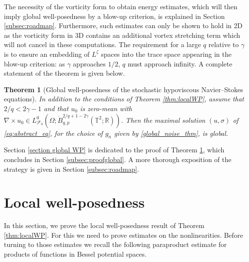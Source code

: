 \documentclass[11pt, a4paper,oneside, reqno]{amsart}
\newtheorem{theorem}{Theorem}
\theoremstyle{remark} %
\theoremstyle{definition} %
\numberwithin{theorem}{section}
\numberwithin{equation}{section}
\def\R{{\mathbb R}}
\newcommand{\Om}{\Omega}
\newcommand{\T}{\mathbb{T}}
\newcommand{\mc}{\mathcal}
\newcommand{\gam}{\gamma}
\begin{document}
The necessity of the vorticity form to obtain energy estimates, which will then imply global well-posedness by a blow-up criterion, is explained in Section \ref{subsec:roadmap}. Furthermore, such estimates can only be shown to hold in 2D as the vorticity form in 3D contains an additional vortex stretching term which will not cancel in these computations. The requirement for a large $q$ relative to $\gamma$ is to ensure an embedding of $L^\zeta$ spaces into the trace space appearing in the blow-up criterion: as $\gamma$ approaches $1/2$, $q$ must approach infinity. A complete statement of the theorem is given below.

\begin{theorem}[Global well-posedness of the stochastic hypoviscous Navier--Stokes equations]\label{thm:globalWPvelocity}
In addition to the conditions of Theorem \ref{thm:localWP}, assume that $2/q< 2\gam-1$ and that $u_0$ is zero-mean with $\nabla \times u_0 \in L^0_{\mc{F}_0}(\Om; \dot{B}_{q,p}^{2/q+1-2\gam}(\T^2;\R))$.
Then the maximal solution $(u,\sigma)$ of \eqref{eq:abstract_eq}, for the choice of $g_n$ given by \eqref{global_noise_thm}, is global.
\end{theorem}

Section \ref{section global WP} is dedicated to the proof of Theorem \ref{thm:globalWPvelocity}, which concludes in Section \ref{subsec:proofglobal}. A more thorough exposition of the strategy is given in Section \ref{subsec:roadmap}.

\section{Local well-posedness}\label{sec:LWP}
In this section, we prove the local well-posedness result of Theorem \ref{thm:localWP}. For this we need to prove estimates on the nonlinearities. Before turning to those estimates we recall the following paraproduct estimate for products of functions in Bessel potential spaces.
\end{document}
